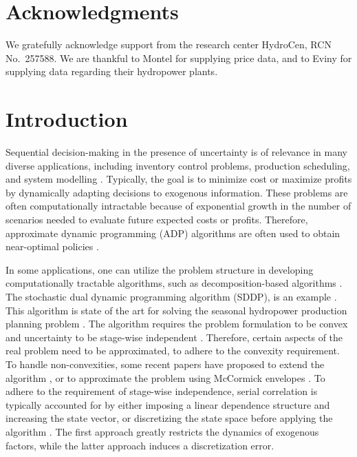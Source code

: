 \section*{Acknowledgments}
We gratefully acknowledge support from the research center HydroCen, RCN No.\ 257588. We are thankful to Montel for supplying price data, and to Eviny for supplying data regarding their hydropower plants.



\section{Introduction}
Sequential decision-making in the presence of uncertainty is of relevance in many diverse applications, including inventory control problems, production scheduling, and system modelling \cite{bertsekas2012dynamic}. Typically, the goal is to minimize cost or maximize profits by dynamically adapting decisions to exogenous information. These problems are often computationally intractable because of exponential growth in the number of scenarios needed to evaluate future expected costs or profits. Therefore, approximate dynamic programming (ADP) algorithms are often used to obtain near-optimal policies \cite{powell2007a}.

In some applications, one can utilize the problem structure in developing computationally tractable algorithms, such as decomposition-based algorithms \cite{van1969shaped,infanger1996cut}. The stochastic dual dynamic programming algorithm (SDDP), is an example \cite{pereira1991a}. This algorithm is state of the art for solving the seasonal hydropower production planning problem \cite{gjelsvik2010a,shapiro2012}. The algorithm requires the problem formulation to be convex and uncertainty to be stage-wise independent \cite{philpott2008a}. Therefore, certain aspects of the real problem need to be approximated, to adhere to the convexity requirement. To handle non-convexities, some recent papers have proposed to extend the algorithm \cite{hjelmeland2018nonconvex,downward2020stochastic}, or to approximate the problem using McCormick envelopes \cite{cerisola2012a}. To adhere to the requirement of stage-wise independence, serial correlation is typically accounted for by either imposing a linear dependence structure and increasing the state vector, or discretizing the state space before applying the algorithm \cite{Lohndorf2019}. The first approach greatly restricts the dynamics of exogenous factors, while the latter approach induces a discretization error.

